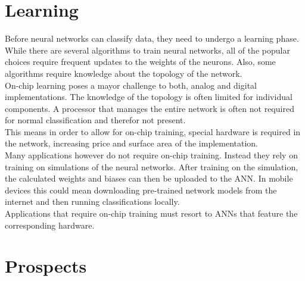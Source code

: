 \documentclass[conference]{IEEEtran}
\begin{document}
    \section{Learning}

    Before neural networks can classify data, they need to undergo a learning phase.
    While there are several algorithms to train neural networks, all of the popular choices require frequent updates to the weights of the neurons.
    Also, some algorithms require knowledge about the topology of the network.\\
    On-chip learning poses a mayor challenge to both, analog and digital implementations.
    The knowledge of the topology is often limited for individual components.
    A processor that manages the entire network is often not required for normal classification and therefor not present. \\
    This means in order to allow for on-chip training, special hardware is required in the network, increasing price and surface area of the implementation. \\
    Many applications however do not require on-chip training.
    Instead they rely on training on simulations of the neural networks.
    After training on the simulation, the calculated weights and biases can then be uploaded to the ANN\@.
    In mobile devices this could mean downloading pre-trained network models from the internet and then running classifications locally. \\

    Applications that require on-chip training must resort to ANNs that feature the corresponding hardware.



    \section{Prospects}
\end{document}
